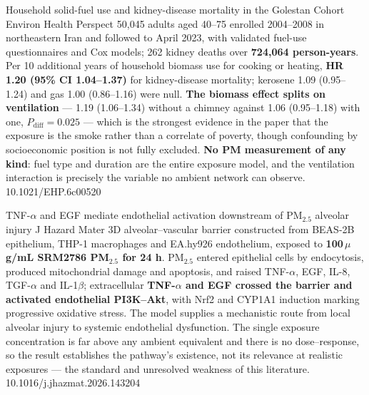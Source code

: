 \documentclass[10pt]{article}
\begin{document}

{Household solid-fuel use and kidney-disease mortality in the Golestan Cohort}
{Environ Health Perspect}
{50{,}045 adults aged 40--75 enrolled 2004--2008 in northeastern Iran and followed to April
2023, with validated fuel-use questionnaires and Cox models; 262 kidney deaths over
\textbf{724{,}064 person-years}. Per 10 additional years of household biomass use for
cooking or heating, \textbf{HR 1.20 (95\% CI 1.04--1.37)} for kidney-disease mortality;
kerosene 1.09 (0.95--1.24) and gas 1.00 (0.86--1.16) were null. \textbf{The biomass effect
splits on ventilation} --- 1.19 (1.06--1.34) without a chimney against 1.06 (0.95--1.18)
with one, $P_{\text{diff}}=0.025$ --- which is the strongest evidence in the paper that the
exposure is the smoke rather than a correlate of poverty, though confounding by
socioeconomic position is not fully excluded. \textbf{No PM measurement of any kind}: fuel
type and duration are the entire exposure model, and the ventilation interaction is
precisely the variable no ambient network can observe.}
{10.1021/EHP.6c00520}


{TNF-$\alpha$ and EGF mediate endothelial activation downstream of PM$_{2.5}$ alveolar injury}
{J Hazard Mater}
{3D alveolar--vascular barrier constructed from BEAS-2B epithelium, THP-1 macrophages and
EA.hy926 endothelium, exposed to \textbf{100\,$\mu$g/mL SRM2786 PM$_{2.5}$ for 24 h}.
PM$_{2.5}$ entered epithelial cells by endocytosis, produced mitochondrial damage and
apoptosis, and raised TNF-$\alpha$, EGF, IL-8, TGF-$\alpha$ and IL-1$\beta$; extracellular
\textbf{TNF-$\alpha$ and EGF crossed the barrier and activated endothelial PI3K--Akt}, with
Nrf2 and CYP1A1 induction marking progressive oxidative stress. The model supplies a
mechanistic route from local alveolar injury to systemic endothelial dysfunction. The
single exposure concentration is far above any ambient equivalent and there is no
dose--response, so the result establishes the pathway's existence, not its relevance at
realistic exposures --- the standard and unresolved weakness of this literature.}
{10.1016/j.jhazmat.2026.143204}

\end{document}
